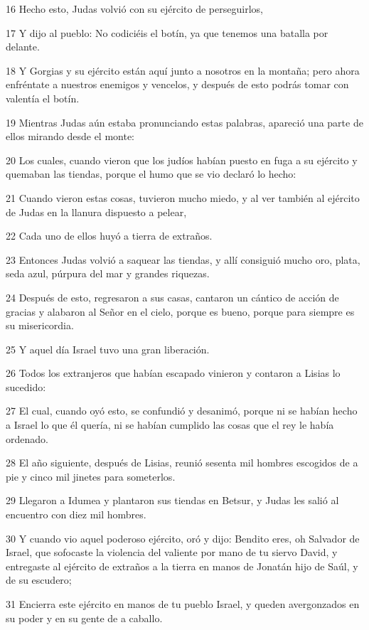 \par 16 Hecho esto, Judas volvió con su ejército de perseguirlos,
\par 17 Y dijo al pueblo: No codiciéis el botín, ya que tenemos una batalla por delante.
\par 18 Y Gorgias y su ejército están aquí junto a nosotros en la montaña; pero ahora enfréntate a nuestros enemigos y vencelos, y después de esto podrás tomar con valentía el botín.
\par 19 Mientras Judas aún estaba pronunciando estas palabras, apareció una parte de ellos mirando desde el monte:
\par 20 Los cuales, cuando vieron que los judíos habían puesto en fuga a su ejército y quemaban las tiendas, porque el humo que se vio declaró lo hecho:
\par 21 Cuando vieron estas cosas, tuvieron mucho miedo, y al ver también al ejército de Judas en la llanura dispuesto a pelear,
\par 22 Cada uno de ellos huyó a tierra de extraños.
\par 23 Entonces Judas volvió a saquear las tiendas, y allí consiguió mucho oro, plata, seda azul, púrpura del mar y grandes riquezas.
\par 24 Después de esto, regresaron a sus casas, cantaron un cántico de acción de gracias y alabaron al Señor en el cielo, porque es bueno, porque para siempre es su misericordia.
\par 25 Y aquel día Israel tuvo una gran liberación.
\par 26 Todos los extranjeros que habían escapado vinieron y contaron a Lisias lo sucedido:
\par 27 El cual, cuando oyó esto, se confundió y desanimó, porque ni se habían hecho a Israel lo que él quería, ni se habían cumplido las cosas que el rey le había ordenado.
\par 28 El año siguiente, después de Lisias, reunió sesenta mil hombres escogidos de a pie y cinco mil jinetes para someterlos.
\par 29 Llegaron a Idumea y plantaron sus tiendas en Betsur, y Judas les salió al encuentro con diez mil hombres.
\par 30 Y cuando vio aquel poderoso ejército, oró y dijo: Bendito eres, oh Salvador de Israel, que sofocaste la violencia del valiente por mano de tu siervo David, y entregaste al ejército de extraños a la tierra en manos de Jonatán hijo de Saúl, y de su escudero;
\par 31 Encierra este ejército en manos de tu pueblo Israel, y queden avergonzados en su poder y en su gente de a caballo.
